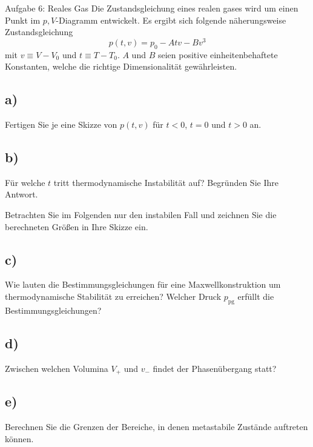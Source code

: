 \begin{aufgabe}{Aufgabe 6: Reales Gas}
    Die Zustandsgleichung eines realen gases wird um einen Punkt im $p,V$-Diagramm entwickelt.
    Es ergibt sich folgende näherungsweise Zustandsgleichung
    \[
        p(t,v) = p_0 - Atv - Bv^3
    \]
    mit $v \equiv V - V_0$ und $t \equiv T - T_0$. $A$ und $B$ seien positive einheitenbehaftete Konstanten, welche die richtige Dimensionalität gewährleisten.

    \subsection{a)}
    Fertigen Sie je eine Skizze von $p(t,v)$ für $t<0$, $t=0$ und $t>0$ an.

    \subsection{b)}
    Für welche $t$ tritt thermodynamische Instabilität auf?
    Begründen Sie Ihre Antwort.


    Betrachten Sie im Folgenden nur den instabilen Fall und zeichnen Sie die berechneten Größen in Ihre Skizze ein.

    \subsection{c)}
    Wie lauten die Bestimmungsgleichungen für eine Maxwellkonstruktion um thermodynamische Stabilität zu erreichen?
    Welcher Druck $p_\text{pg}$ erfüllt die Bestimmungsgleichungen?

    \subsection{d)}
    Zwischen welchen Volumina $V_+$ und $v_-$ findet der Phasenübergang statt?

    \subsection{e)}
    Berechnen Sie die Grenzen der Bereiche, in denen metastabile Zustände auftreten können.
\end{aufgabe}

